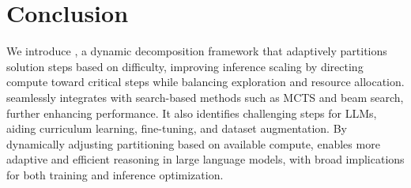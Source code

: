 \vspace{-0.4cm}
\section{Conclusion}  
\vspace{-0.2cm}
We introduce \decomp, a dynamic decomposition framework that adaptively partitions solution steps based on difficulty, improving inference scaling by directing compute toward critical steps while balancing exploration and resource allocation. 
\decomp seamlessly integrates with search-based methods such as MCTS and beam search, further enhancing performance.
It also identifies challenging steps for LLMs, aiding curriculum learning, fine-tuning, and dataset augmentation. By dynamically adjusting partitioning based on available compute, \decomp enables more adaptive and efficient reasoning in large language models, with broad implications for both training and inference optimization.


